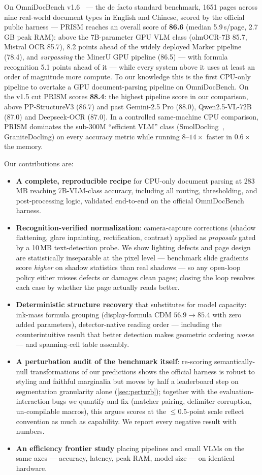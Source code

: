 On OmniDocBench v1.6~\cite{omnidocbench} --- the de facto standard benchmark, 1651 pages across nine real-world document types in English and Chinese, scored by the official public harness --- PRISM reaches an overall score of \textbf{86.6} (median 5.9\,s/page, 2.7\,GB peak RAM): above the 7B-parameter GPU VLM class (olmOCR-7B 85.7, Mistral OCR 85.7), 8.2 points ahead of the widely deployed Marker pipeline (78.4), and \emph{surpassing} the MinerU GPU pipeline (86.5) --- with formula recognition 5.1 points ahead of it --- while every system above it uses at least an order of magnitude more compute. To our knowledge this is the first CPU-only pipeline to overtake a GPU document-parsing pipeline on OmniDocBench. On the v1.5 cut PRISM scores \textbf{88.4}: the highest pipeline score in our comparison, above PP-StructureV3 (86.7) and past Gemini-2.5 Pro (88.0), Qwen2.5-VL-72B (87.0) and Deepseek-OCR (87.0). In a controlled same-machine CPU comparison, PRISM dominates the sub-300M ``efficient VLM'' class (SmolDocling~\cite{smoldocling}, GraniteDocling) on every accuracy metric while running $8$--$14\times$ faster in $0.6\times$ the memory.

Our contributions are:
\begin{itemize}
  \item \textbf{A complete, reproducible recipe} for CPU-only document parsing at 283\,MB reaching 7B-VLM-class accuracy, including all routing, thresholding, and post-processing logic, validated end-to-end on the official OmniDocBench harness.
  \item \textbf{Recognition-verified normalization}: camera-capture corrections (shadow flattening, glare inpainting, rectification, contrast) applied as \emph{proposals} gated by a 10\,MB text-detection probe. We show lighting defects and page design are statistically inseparable at the pixel level --- benchmark slide gradients score \emph{higher} on shadow statistics than real shadows --- so any open-loop policy either misses defects or damages clean pages; closing the loop resolves each case by whether the page actually reads better.
  \item \textbf{Deterministic structure recovery} that substitutes for model capacity: ink-mass formula grouping (display-formula CDM $56.9 \rightarrow 85.4$ with zero added parameters), detector-native reading order --- including the counterintuitive result that better detection makes geometric ordering \emph{worse} --- and spanning-cell table assembly.
  \item \textbf{A perturbation audit of the benchmark itself}: re-scoring semantically-null transformations of our predictions shows the official harness is robust to styling and faithful marginalia but moves by half a leaderboard step on segmentation granularity alone (\cref{sec:perturb}); together with the evaluation-interaction bugs we quantify and fix (matcher pairing, delimiter corruption, un-compilable macros), this argues scores at the $\leq$0.5-point scale reflect convention as much as capability. We report every negative result with numbers.
  \item \textbf{An efficiency frontier study} placing pipelines and small VLMs on the same axes --- accuracy, latency, peak RAM, model size --- on identical hardware.
\end{itemize}
